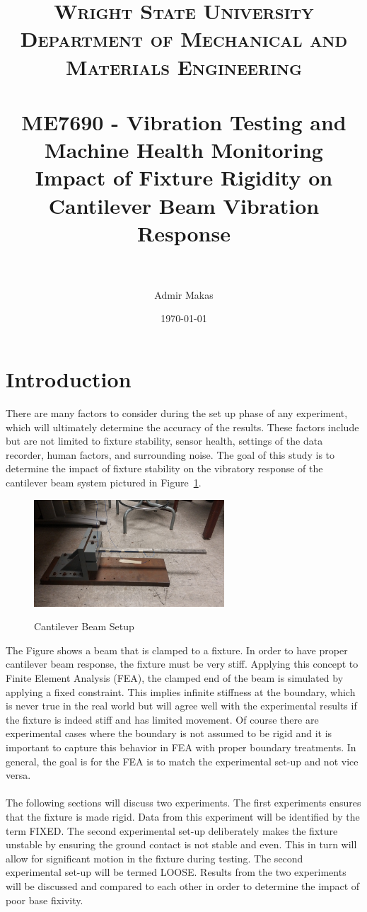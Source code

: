 \documentclass[paper=a4, fontsize=12pt]{scrartcl} %
\title{	
\normalfont \normalsize 
\textsc{Wright State University\\ Department of Mechanical and Materials Engineering} \\ [25pt] %
\horrule{0.5pt} \\[0.4cm] %
\large ME7690 - Vibration Testing and Machine Health Monitoring \\ %
\huge Impact of Fixture Rigidity on Cantilever Beam Vibration Response\\
\horrule{2pt} \\[0.4cm] %
}
\author{Admir Makas} %
\date{\normalsize\today} %
\begin{document}
\maketitle %

\section*{Introduction}
There are many factors to consider during the set up phase of any experiment, which will ultimately determine the accuracy of the results. These factors include but are not limited to fixture stability, sensor health, settings of the data recorder, human factors, and surrounding noise. The goal of this study is to determine the impact of fixture stability on the vibratory response of the cantilever beam system pictured in Figure~\ref{fig:beamSideProfile1}.
%
	\begin{figure}[H]
		\centering
		{
		\includegraphics[height=4.0cm]{BeamSideProfile.jpg}
		}
		\caption{Cantilever Beam Setup}
		\label{fig:beamSideProfile1}
	\end{figure}
%
The Figure shows a beam that is clamped to a fixture. In order to have proper cantilever beam response, the fixture must be very stiff. Applying this concept to Finite Element Analysis (FEA), the clamped end of the beam is simulated by applying a fixed constraint. This implies infinite stiffness at the boundary, which is never true in the real world but will agree well with the experimental results if the fixture is indeed stiff and has limited movement. Of course there are experimental cases where the boundary is not assumed to be rigid and it is important to capture this behavior in FEA with proper boundary treatments. In general, the goal is for the FEA is to match the experimental set-up and not vice versa.
\\
\\
The following sections will discuss two experiments. The first experiments ensures that the fixture is made rigid. Data from this experiment will be identified by the term FIXED. The second experimental set-up deliberately makes the fixture unstable by ensuring the ground contact is not stable and even. This in turn will allow for significant motion in the fixture during testing. The second experimental set-up will be termed LOOSE. Results from the two experiments will be discussed and compared to each other in order to determine the impact of poor base fixivity.
%
%
\end{document}
